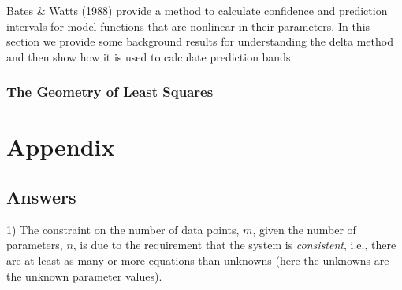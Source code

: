 Bates \& Watts (1988) provide a method to calculate confidence and prediction intervals
for model functions that are nonlinear in their parameters. 
In this section we provide some background results for understanding the delta method
and then show how it is used to calculate prediction bands.

\subsubsection{The Geometry of Least Squares}


\clearpage
\section{Appendix}

\subsection{Answers}

1) The constraint on the number of data points, \(m\), given the number
of parameters, \(n\), is due to the requirement that the system is
\emph{consistent}, i.e., there are at least as many or more equations
than unknowns (here the unknowns are the unknown parameter values).

